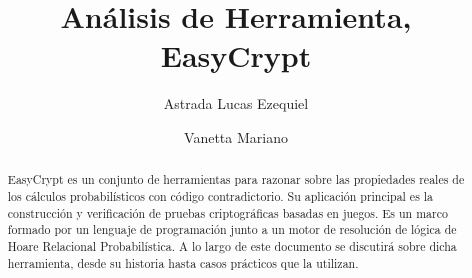 \documentclass[runningheads,a4paper]{llncs}
\begin{document}
\mainmatter  %

\title{Análisis de Herramienta, EasyCrypt}


%
%
\author
{
Astrada Lucas Ezequiel
\and
Vanetta Mariano
}
%


%
%

\maketitle


\begin{abstract}    
EasyCrypt es un conjunto de herramientas para razonar sobre las propiedades reales de los cálculos probabilísticos con código contradictorio. Su aplicación principal es la construcción y verificación de pruebas criptográficas basadas en juegos. 
Es un marco formado por un lenguaje de programación junto a un motor de resolución de lógica de Hoare Relacional Probabilística. A lo largo de este documento se discutirá sobre dicha herramienta, desde su historia hasta casos prácticos que la utilizan.
\cite{article1}


\end{abstract}
\end{document}
